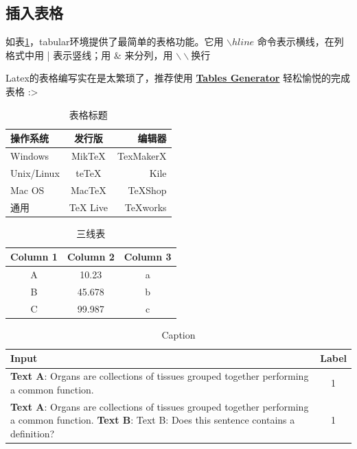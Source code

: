 \subsection{插入表格}
如表\ref{tab:mytab2}，tabular环境提供了最简单的表格功能。它用 $\backslash hline$ 命令表示横线，在列格式中用 | 表示竖线；用 $\&$ 来分列，用 $\backslash\backslash$换行 

Latex的表格编写实在是太繁琐了，推荐使用 \textbf{\href{http://www.tablesgenerator.com/}{Tables Generator}} 轻松愉悦的完成表格 :>

\begin{table}[htbp]
    \centering
    \begin{tabular}{|l|c|r|}
         \hline
        操作系统& 发行版& 编辑器\\
         \hline
        Windows & MikTeX & TexMakerX \\
         \hline
        Unix/Linux & teTeX & Kile \\
         \hline
        Mac OS & MacTeX & TeXShop \\
         \hline
        通用& TeX Live & TeXworks \\
         \hline
    \end{tabular}
    \caption{表格标题}
    \label{tab:mytab2}
\end{table}

\begin{table}[h!]
    \centering
      \begin{tabular}{ccc}
        \toprule 
        \textbf{Column 1} & \textbf{Column 2} & \textbf{Column 3}\\
        \midrule
        A & 10.23 & a\\
        B & 45.678 & b\\
        C & 99.987 & c\\
        \bottomrule
      \end{tabular}
    \caption{三线表}
    \label{tab:mytab2_}
\end{table}

\begin{table}[t!]
    \centering
    \small 
    \begin{tabularx}{0.5\linewidth}{X|c} %
    \toprule
      Input   &  Label \\
    \midrule
     \textbf{Text A}:  Organs are collections of tissues grouped together performing a common function.
  &  1  \\ 
   \midrule  
  \textbf{Text A}: Organs are collections of tissues grouped together performing a common function. 
  \textbf{Text B}: Text B: Does this sentence contains a definition? 
& 1 \\ 
    \bottomrule
    \end{tabularx}
    \caption{Caption}
    \label{tab:my_label}
\end{table}

